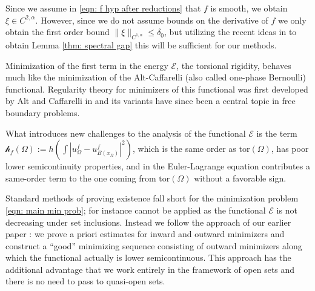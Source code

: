 \documentclass[10pt,a4paper]{amsart}
\numberwithin{equation}{section}
\def\W{\Omega}
\def\tor{\mathrm{tor}}
\def\nl{\mathscr{h}_f}
\begin{document}
{Since we assume in \eqref{eqn: f hyp after reductions} that $f$ is smooth, we obtain $\xi \in C^{2,\alpha}$. However, since we do not assume bounds on the derivative of $f$ we only obtain the first order bound $\|\xi\|_{C^{1,\alpha}}\leq \delta_0$, but utilizing the recent ideas in \cite{p24} to obtain Lemma \ref{thm: spectral gap} this will be sufficient for our methods.} 

Minimization of the first term in the energy $\mathcal{E}$, the torsional rigidity, behaves much like the minimization of the Alt-Caffarelli (also called one-phase Bernoulli) functional. Regularity theory for minimizers of this functional was first developed by Alt and Caffarelli in \cite{AC81} and its variants have since been a central topic in free boundary problems. 

What introduces new challenges to the analysis of the functional $\mathcal{E}$ is the term $\nl(\W):= h(\int |u_\W^f - u_{B(x_\W)}^f|^2)$, which is the same order as $\tor(\W)$, has poor lower semicontinuity properties, and in the Euler-Lagrange equation contributes a same-order term to the one coming from $\tor(\W)$ without a favorable sign.

Standard methods of proving existence fall short for the minimization problem \eqref{eqn: main min prob}; for instance 
\cite{BuDalMaso} cannot be applied as the functional $\mathcal{E}$ is not decreasing under set inclusions. Instead we follow the approach of our earlier paper \cite{AKN2}: we prove a priori estimates for inward and outward minimizers and construct a ``good'' minimizing sequence consisting of outward minimizers along which the functional actually is lower semicontinuous. This approach has the additional advantage that we work entirely in the framework of open sets and  there is no  need to pass to quasi-open sets.
\end{document}
